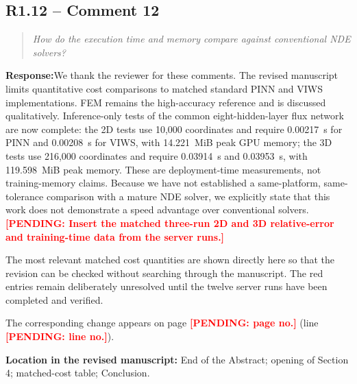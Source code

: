 \documentclass[11pt,a4paper]{article}
\newenvironment{reviewercomment}{\begin{quote}\small\itshape\color{commentgray}}{\end{quote}}
\newcommand{\authorresponse}{\noindent\textbf{Response:}\quad}
\newcommand{\revisionlocation}[1]{\par\noindent\textcolor{locationblue}{\textbf{Location in the revised manuscript: }}#1}
\newcommand{\draftplaceholder}[1]{\textcolor{red}{\textbf{[PENDING: #1]}}}
\begin{document}
\subsection*{R1.12 -- Comment 12}
\begin{reviewercomment}
How do the execution time and memory compare against conventional NDE solvers?
\end{reviewercomment}
\authorresponse We thank the reviewer for these comments. The revised manuscript limits quantitative cost comparisons to matched standard PINN and VIWS implementations. FEM remains the high-accuracy reference and is discussed qualitatively. Inference-only tests of the common eight-hidden-layer flux network are now complete: the 2D tests use 10,000 coordinates and require 0.00217~s for PINN and 0.00208~s for VIWS, with 14.221~MiB peak GPU memory; the 3D tests use 216,000 coordinates and require 0.03914~s and 0.03953~s, with 119.598~MiB peak memory. These are deployment-time measurements, not training-memory claims. Because we have not established a same-platform, same-tolerance comparison with a mature NDE solver, we explicitly state that this work does not demonstrate a speed advantage over conventional solvers. \draftplaceholder{Insert the matched three-run 2D and 3D relative-error and training-time data from the server runs.}

The most relevant matched cost quantities are shown directly here so that the revision can be checked without searching through the manuscript. The red entries remain deliberately unresolved until the twelve server runs have been completed and verified.

\begin{table}[H]
\centering
\caption{Matched PINN--VIWS accuracy and cost comparison reported in the revised manuscript. Values are medians [ranges] over three runs.}
\label{tab:response_matched_cost}
\renewcommand{\arraystretch}{1.15}
\end{table}
The corresponding change appears on page \draftplaceholder{page no.} (line \draftplaceholder{line no.}).
\revisionlocation{End of the Abstract; opening of Section 4; matched-cost table; Conclusion.}
\end{document}
